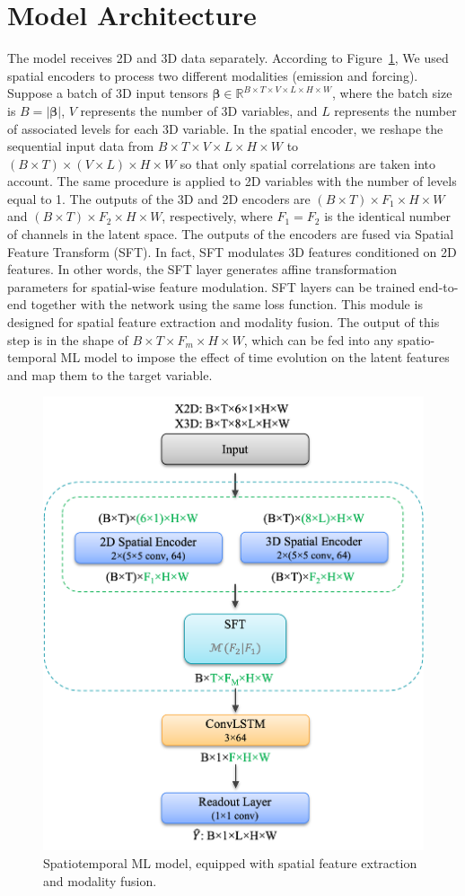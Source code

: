 \documentclass{article}
\begin{document}
\section{Model Architecture} \label{sec:appendix-2}
    The model receives 2D and 3D data separately. According to Figure~\ref{fig:model_architecture}, We used spatial encoders to process two different modalities (emission and forcing). Suppose a batch of 3D input tensors $\mathbf{\beta} \in \mathbb{R}^{B \times T \times V \times L \times H \times W}$, where the batch size is $B = |\mathbf{\beta}|$, $V$ represents the number of 3D variables, and $L$ represents the number of associated levels for each 3D variable. In the spatial encoder, we reshape the sequential input data from $B \times T \times V \times L \times H \times W$ to $(B \times T) \times (V \times L) \times H \times W$ so that only spatial correlations are taken into account. The same procedure is applied to 2D variables with the number of levels equal to 1. The outputs of the 3D and 2D encoders are $(B \times T) \times F_1 \times H \times W$ and $(B \times T) \times F_2 \times H \times W$, respectively, where $F_1 = F_2$ is the identical number of channels in the latent space. The outputs of the encoders are fused via Spatial Feature Transform (SFT). In fact, SFT modulates 3D features conditioned on 2D features. In other words, the SFT layer generates affine transformation parameters for spatial-wise feature modulation. SFT layers can be trained end-to-end together with the network using the same loss function. This module is designed for spatial feature extraction and modality fusion. The output of this step is in the shape of $B \times T \times F_m \times H \times W$, which can be fed into any spatio-temporal ML model to impose the effect of time evolution on the latent features and map them to the target variable.

    \begin{figure}[htbp]
        \centering
        \includegraphics[width=0.7\linewidth]{model_architecture.png}
        \caption{Spatiotemporal ML model, equipped with spatial feature extraction and modality fusion.}
        \label{fig:model_architecture}
    \end{figure}
\end{document}
